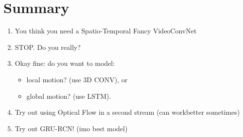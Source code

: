 \section*{Summary}
\begin{enumerate}
\item You think you need a Spatio-Temporal Fancy VideoConvNet
\item STOP. Do you really?
\item Okay fine: do you want to model:
\begin{itemize}
\item local motion? (use 3D CONV), or
\item global motion? (use LSTM).
\end{itemize}
\item Try out using Optical Flow in a second stream (can workbetter sometimes)
\item Try out GRU-RCN! (imo best model)
\end{enumerate}
